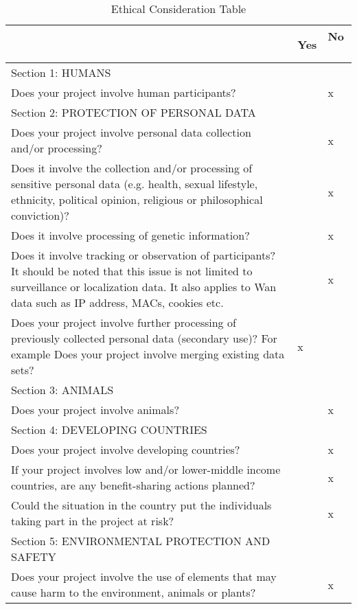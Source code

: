 \begin{center}
    \begin{longtable}{ | m{30em} | m{1.5em} | m{1.5em} | }
    \caption{Ethical Consideration Table}
    \label{tbl:ethical-table}
    \hline
    & Yes & No \ \\ \hline
    \cellcolor[HTML]{C0C0C0} Section 1: HUMANS &  & \  \\ \hline
    Does your project involve human participants? &  & x \\ \hline
    \cellcolor[HTML]{C0C0C0} Section 2: PROTECTION OF PERSONAL DATA &  & \  \\ \hline
    Does your project involve personal data collection and/or processing? & & x \\ \hline
    Does it involve the collection and/or processing of sensitive personal data (e.g. health, sexual lifestyle, ethnicity, political opinion, religious or philosophical conviction)? & & x \\ \hline
    Does it involve processing of genetic information? & & x  \\ \hline
    Does it involve tracking or observation of participants? It should be noted that this issue is not limited to surveillance or localization data. It also applies to Wan data such as IP address, MACs, cookies etc. & & x  \\ \hline
    Does your project involve further processing of previously collected personal data (secondary use)? For example Does your project involve merging existing data sets? & x &  \\ \hline
    \cellcolor[HTML]{C0C0C0} Section 3: ANIMALS & & \  \\ \hline
    Does your project involve animals? & & x  \\ \hline
    \cellcolor[HTML]{C0C0C0} Section 4: DEVELOPING COUNTRIES &  & \  \\ \hline
    Does your project involve developing countries? & & x  \\ \hline
    If your project involves low and/or lower-middle income countries, are any benefit-sharing actions planned? & & x  \\ \hline
    Could the situation in the country put the individuals taking part in the project at risk? & & x  \\ \hline
    \cellcolor[HTML]{C0C0C0} Section 5: ENVIRONMENTAL PROTECTION AND SAFETY &  & \  \\ \hline
    Does your project involve the use of elements that may cause harm to the environment, animals or plants? & & x  \\ \hline

\end{longtable}
\end{center}
